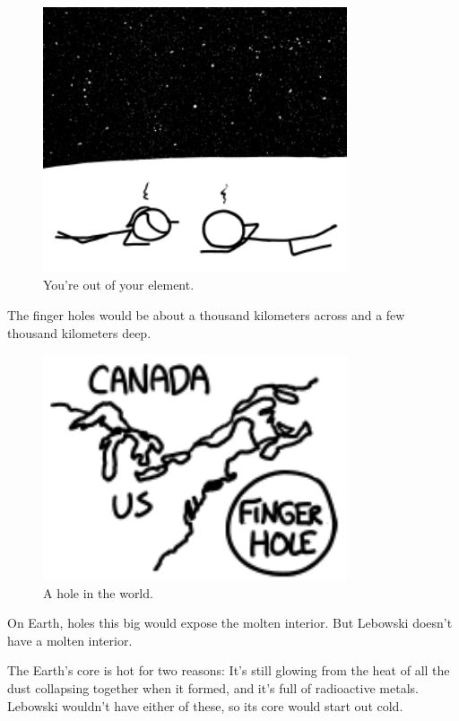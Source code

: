 {\begin{figure}[!htbp]
\centering
\includegraphics[scale=0.5, max width=0.8\textwidth]{imgs/a/46/bowling_dead.png}
\caption{You’re out of your element.}
\end{figure}

{The finger holes would be about a thousand kilometers across and a few thousand kilometers deep.}

\begin{figure}[!htbp]
\centering
\includegraphics[scale=0.5, max width=0.8\textwidth]{imgs/a/46/bowling_holes.png}
\caption{A hole in the world.}
\end{figure}

{On Earth, holes this big would expose the molten interior. But Lebowski doesn’t have a molten interior.}

{The Earth’s core is hot for two reasons: It’s still glowing from the heat of all the dust collapsing together when it formed, and it’s full of radioactive metals. Lebowski wouldn’t have either of these, so its core would start out cold.}

}
